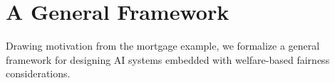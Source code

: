 \documentclass{article}[11pt]
\begin{document}
\begin{comment}
An alternative integration perspective is to incorporate welfare-based fairness considerations into the learning components, and we refer to these as {\em in-processing} integration. We specify an example where the bank uses a classification model to predict whether an applicant is qualified. Suppose applicant $i$ has true label $y_i = 1$ if he/she is qualified and $y_i = -1$ otherwise, and the classification model generates a predicted label $\hat{y}_i \in \{1,-1\}$ for the applicant. The standard training algorithm minimizes the predictive loss, or equivalently maximizes the classification accuracy. To incorporate welfare-based fairness, utilities need to be defined with respect to classification outcomes, namely, $\vu = \vU(\hat{\vy})$. For example, we consider a linear utility format, $u_i(\hat{y}_i) = b_i + g_i\hat{y}_i$, where $b_i, g_i$ respectively denote $i$'s starting utility and additional utility gain/loss from classification. As we later illustrate in our case study, we can assign $b_i, g_i$ based on a person's true label $y_i$. Note that $b_i, g_i$ values should fit the classification contexts. For example, we expect a true positive outcome to have a higher utility than a false negative outcome, that is, when $y_i = 1$, the selected $b_i, g_i$ should satisfy $u_i(1) > u_i(-1)$. One convenient way to use classification outcomes is to approve the loan requests by all applicants classified to be qualified, namely $\hat{y}_i = 1$. Depending on the available funds to distribute as loans, the bank may adjust the classification model to be more or less strict at labeling applicants as qualified, thus leading to larger or smaller total loan requests. 
\end{comment}




\section{A General Framework} \label{sec:framework}
Drawing motivation from the mortgage example, we formalize a general framework for designing AI systems embedded with welfare-based fairness considerations. 
\end{document}
